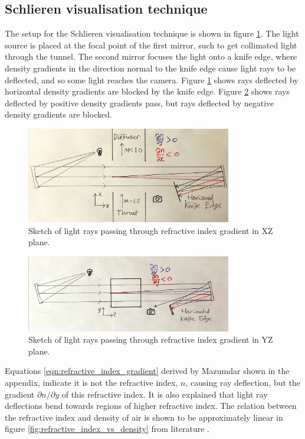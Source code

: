 \documentclass{article}
\begin{document}
\subsection{Schlieren visualisation technique}

The setup for the Schlieren visualisation technique is shown in figure \ref{fig:xz_shlierian}.
The light source is placed at the focal point of the first mirror, such to get collimated light through the tunnel.
The second mirror focuses the light onto a knife edge, where density gradients in the direction normal to the knife edge cause light rays to be deflected, and so some light reaches the camera.
Figure \ref{fig:xz_shlierian} shows rays deflected by horizontal density gradients are blocked by the knife edge.
Figure \ref{fig:yz_shlierian} shows rays deflected by positive density gradients pass, but rays deflected by negative density gradients are blocked.

\begin{figure}[H]
    \centering
    \includegraphics[width=0.8\textwidth]{xz_shlierian.jpg}
    \caption{Sketch of light rays passing through refractive index gradient in XZ plane.}
    \label{fig:xz_shlierian}
\end{figure}

\begin{figure}[H]
    \centering
    \includegraphics[width=0.8\textwidth]{yz_shlierian.jpg}
    \caption{Sketch of light rays passing through refractive index gradient in YZ plane.}
    \label{fig:yz_shlierian}
\end{figure}

Equations \ref{eqn:refractive_index_gradient} derived by Mazumdar \cite{Mazumdar_Amrita:2013} shown in the appendix, indicate it is not the refractive index, $n$, causing ray deflection, but the gradient $\partial n / \partial y$ of this refractive index.
It is also explained that light ray deflections bend towards regions of higher refractive index.
The relation between the refractive index and density of air is shown to be approximately linear in figure \ref{fig:refractive_index_vs_density} from literature \cite{refractiveindex_info} \cite{Ciddor:96}.
\end{document}
